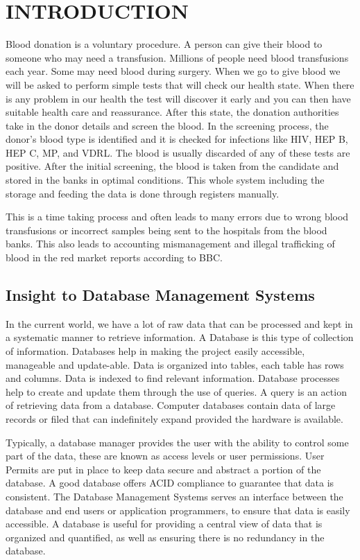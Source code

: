 \documentclass[BTech]{srmuthesis}
\begin{document}
\chapter{INTRODUCTION}
\label{chap:intro}
Blood donation is a voluntary procedure. A person can give their blood to someone who may need a transfusion. Millions of people need blood transfusions each year. Some may need blood during surgery. When we go to give blood we will be asked to perform simple tests that will check our health state. When there is any problem in our health the test will discover it early and you can then have suitable health care and reassurance. After this state, the donation authorities take in the donor details and screen the blood. In the screening process, the donor’s blood type is identified and it is checked for infections like \ac{HIV}, \ac{HEP B}, \ac{HEP C}, \ac{MP}, and \ac{VDRL}. The blood is usually discarded of any of these tests are positive. After the initial screening, the blood is taken from the candidate and stored in the banks in optimal conditions. This whole system including the storage and feeding the data is done through registers manually.\par 
This is a time taking process and often leads to many errors due to wrong blood transfusions or incorrect samples being sent to the hospitals from the blood banks. This also leads to accounting mismanagement and illegal trafficking of blood in the red market reports according to BBC. 
\section{Insight to Database Management Systems}
In the current world, we have a lot of raw data that can be processed and kept in a systematic manner to retrieve information. A Database is this type of collection of information. Databases help in making the project easily accessible, manageable and update-able. Data is organized into tables, each table has rows and columns. Data is indexed to find relevant information. Database processes help to create and update them through the use of queries. A query is an action of retrieving data from a database. Computer databases contain data of large records or filed that can indefinitely expand provided the hardware is available.\par 
Typically, a database manager provides the user with the ability to control some part of the data, these are known as access levels or user permissions. User Permits are put in place to keep data secure and abstract a portion of the database. A good database offers \ac{ACID} compliance to guarantee that data is consistent. The Database Management Systems serves an interface between the database and end users or application programmers, to ensure that data is easily accessible. A database is useful for providing a central view of data that is organized and quantified, as well as ensuring there is no redundancy in the database. 
\end{document}
